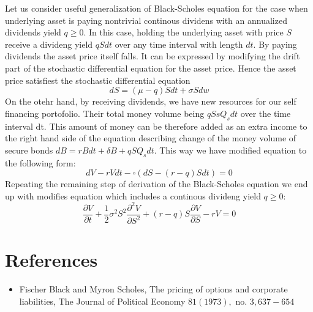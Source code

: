 \documentclass[a4paper]{article}
\begin{document}
Let us consider useful generalization of Black-Scholes equation for the case when underlying asset is paying nontrivial continous dividens with an annualized dividends yield $q \geq 0 $. In this case, holding the underlying asset with price $S$ receive a divideng yield
$qSdt$ over any time interval with length $dt$. By paying dividends the asset price itself falls. It can be expressed by modifying the drift part of the stochastic differential equation for the asset price. Hence the asset price satisfiest the stochastic differential equation
\begin{equation}
    d S=(\mu-q) S d t+\sigma S d w
\end{equation}
On the otehr hand, by receiving dividends, we have new resources for our self financing portofolio. Their total money volume being $qSsQ_sdt$ over the time interval dt. This amount of money can be therefore added as an extra income to the right hand side of the equation describing change of the money volume of secure bonds $dB = rBdt + \delta B + qSQ_s dt$.
This way we have modified equation to the following form:
\begin{equation}
    d V-r V d t-\square(d S-(r-q) S d t)=0
\end{equation}
Repeating the remaining step of derivation of the Black-Scholes equation we end up with modifies equation which includes a continous divideng yield $q \geq 0$:
\begin{equation}
    \frac{\partial V}{\partial t}+\frac{1}{2} \sigma^{2} S^{2} \frac{\partial^{2} V}{\partial S^{2}}+(r-q) S \frac{\partial V}{\partial S}-r V=0
\end{equation}
\section{References}
\begin{itemize}
    \item Fischer Black and Myron Scholes, The pricing of options and corporate liabilities, The Journal of Political Economy $81(1973),$ no. $3,637-654$
\end{itemize}
\end{document}
